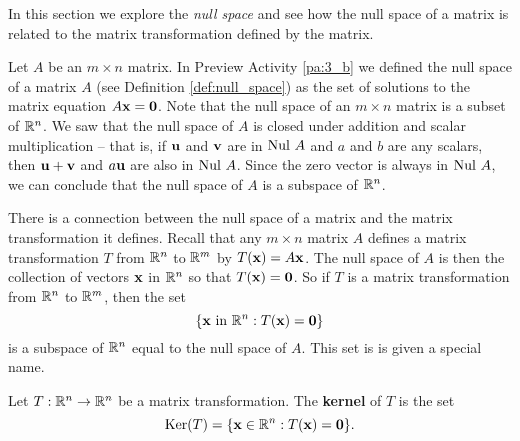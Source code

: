 
In this section we explore the \emph{null space} and see how the null space of a matrix is related to the matrix transformation defined by the matrix. 


Let $A$ be an $m \times n$ matrix. In Preview Activity \ref{pa:3_b} we defined the null space of a matrix $A$ (see Definition \ref{def:null_space}) as the set of solutions to the matrix equation $A \mathbf{x} = \mathbf{0}$. Note that the null space of an $m \times n$ matrix is a subset of $\mathbb{R}^n$. We saw that the null space of $A$ is closed under addition and scalar multiplication -- that is, if $\mathbf{u}$ and $\mathbf{v}$ are in $\text{Nul } A$ and $a$ and $b$ are any scalars, then $\mathbf{u} + \mathbf{v}$ and $a \mathbf{u}$ are also in $\text{Nul } A$. Since the zero vector is always in $\text{Nul } A$, we can conclude that the null space of $A$ is a subspace of $\mathbb{R}^n$. 



There is a connection between the null space of a matrix and the matrix transformation it defines. Recall that any $m \times n$ matrix $A$ defines a matrix transformation $T$ from $\mathbb{R}^n$ to $\mathbb{R}^m$ by $T(\mathbf{x}) = A \mathbf{x}$. The null space of $A$ is then the collection of vectors $\mathbf{x}$ in $\mathbb{R}^n$ so that $T(\mathbf{x}) = \mathbf{0}$. So if $T$ is a matrix transformation from $\mathbb{R}^n$ to $\mathbb{R}^m$, then the set 
\[\{\mathbf{x} \text{ in } \mathbb{R}^n : T(\mathbf{x}) = \mathbf{0}\}\]
 is a subspace of $\mathbb{R}^n$ equal to the null space of $A$. This set is is given a special name. 



\begin{definition} Let $T : \mathbb{R}^n \to \mathbb{R}^n$ be a matrix transformation. The \textbf{kernel} of $T$ is the set
\[\text{Ker}(T) = \{\mathbf{x} \in \mathbb{R}^n : T(\mathbf{x}) = \mathbf{0}\}.\]
\end{definition}


